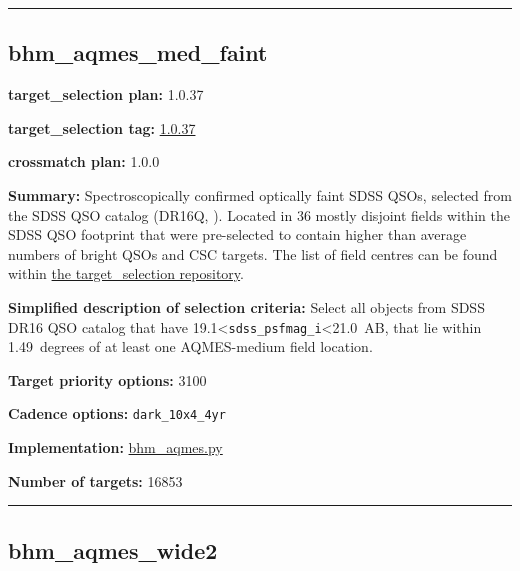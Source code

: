 \begin{center}\rule{0.5\linewidth}{0.5pt}\end{center}

\hypertarget{bhm_aqmes_med_faint_plan1.0.37}{%
\subsection{bhm\_aqmes\_med\_faint}\label{bhm_aqmes_med_faint_plan1.0.37}}

\noindent\textbf{target\_selection plan:} 1.0.37

\noindent\textbf{target\_selection tag:}
\href{https://github.com/sdss/target_selection/tree/1.0.37/}{1.0.37}

\noindent\textbf{crossmatch plan:} 1.0.0

\noindent\textbf{Summary:} Spectroscopically confirmed optically faint SDSS QSOs,
selected from the SDSS QSO catalog (DR16Q,
\citealt{Lyke2020}). Located in 36 mostly disjoint fields within the SDSS QSO
footprint that were pre-selected to contain higher than average numbers
of bright QSOs and CSC targets. The list of field centres can be found
within
\href{https://github.com/sdss/target_selection/blob/0.3.0/python/target_selection/masks/candidate_target_fields_bhm_aqmes_med_v0.3.1.fits}{the
target\_selection repository}.

\noindent\textbf{Simplified description of selection criteria:} Select all
objects from SDSS DR16 QSO catalog that have
19.1\textless{}\texttt{sdss\_psfmag\_i}\textless21.0~AB, that lie within
1.49~degrees of at least one AQMES-medium field location.


\noindent\textbf{Target priority options:} 3100

\noindent\textbf{Cadence options:} \texttt{dark\_10x4\_4yr}

\noindent\textbf{Implementation:}
\href{https://github.com/sdss/target_selection/blob/1.0.37/python/target_selection/cartons/bhm_aqmes.py}{bhm\_aqmes.py}

\noindent\textbf{Number of targets:} 16853

\begin{center}\rule{0.5\linewidth}{0.5pt}\end{center}

\hypertarget{bhm_aqmes_wide2_plan1.0.37}{%
\subsection{bhm\_aqmes\_wide2}\label{bhm_aqmes_wide2_plan1.0.37}}

